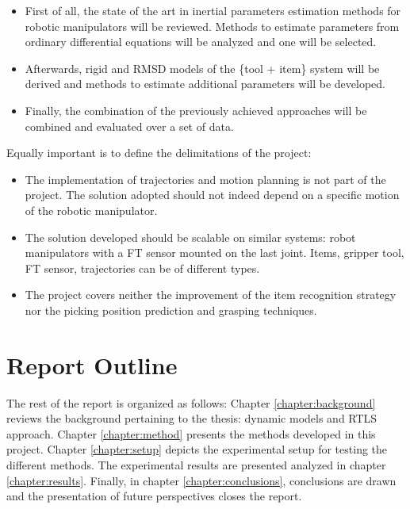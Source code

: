 \documentclass[/home/francois/latex/report/main.tex]{subfiles}
\begin{document}
\begin{itemize}
    \item First of all, the state of the art in inertial parameters estimation methods for robotic manipulators will be reviewed. Methods to estimate parameters from ordinary differential equations will be analyzed and one will be selected.
    \item Afterwards, rigid and \ac{RMSD} models of the \{tool + item\} system will be derived and methods to estimate additional parameters will be developed.
    \item Finally, the combination of the previously achieved approaches will be combined and evaluated over a set of data.
\end{itemize}

Equally important is to define the delimitations of the project:

\begin{itemize}
    \item The implementation of trajectories and motion planning is not part of the project. The solution adopted should not indeed depend on a specific motion of the robotic manipulator.
    \item The solution developed should be scalable on similar systems: robot manipulators with a \ac{FT} sensor mounted on the last joint. Items, gripper tool, \ac{FT} sensor, trajectories can be of different types.
    \item The project covers neither the improvement of the item recognition strategy nor the picking position prediction and grasping techniques.
\end{itemize}


\section{Report Outline}

The rest of the report is organized as follows: Chapter \ref{chapter:background} reviews the background pertaining to the thesis: dynamic models and \ac{RTLS} approach. Chapter \ref{chapter:method} presents the methods developed in this project. Chapter \ref{chapter:setup} depicts the experimental setup for testing the different methods. The experimental results are presented analyzed in chapter \ref{chapter:results}. Finally, in chapter \ref{chapter:conclusions}, conclusions are drawn and the presentation of future perspectives closes the report.
\end{document}
